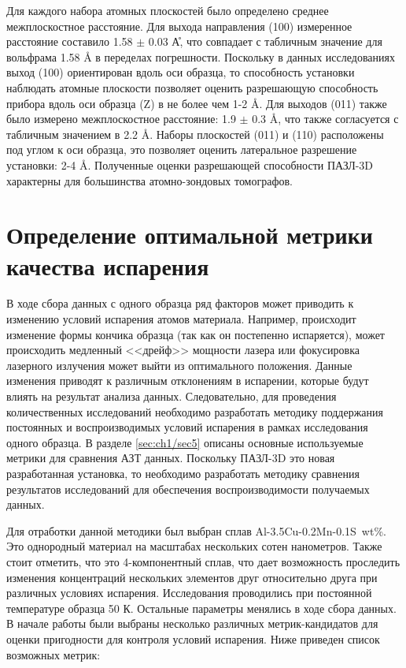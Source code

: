 Для каждого набора атомных плоскостей было определено среднее межплоскостное расстояние. Для выхода направления (100) измеренное расстояние составило 1.58 $\pm$ 0.03 \r{А}, что совпадает с табличным значение для вольфрама 1.58 \r{A} в переделах погрешности. Поскольку в данных исследованиях выход (100) ориентирован вдоль оси образца, то способность установки наблюдать атомные плоскости позволяет оценить разрешающую способность прибора вдоль оси образца (Z) в не более чем 1-2 \r{A}. Для выходов (011) также было измерено межплоскостное расстояние: 1.9 $\pm$ 0.3 \r{A}, что также согласуется с табличным значением в 2.2 \r{A}. Наборы плоскостей (011) и (110) расположены под углом к оси образца, это позволяет оценить латеральное разрешение установки: 2-4 \r{A}. Полученные оценки разрешающей способности ПАЗЛ-3D  характерны для большинства атомно-зондовых томографов. 

\FloatBarrier

\section{Определение оптимальной метрики качества испарения}\label{sec:ch3/sect3}

В ходе сбора данных с одного образца ряд факторов может приводить к изменению условий испарения атомов материала. Например, происходит изменение формы кончика образца (так как он постепенно испаряется), может происходить медленный <<дрейф>>  мощности лазера или фокусировка лазерного излучения может выйти из оптимального положения. Данные изменения приводят к различным отклонениям в испарении, которые будут влиять на результат анализа данных. Следовательно, для проведения количественных исследований необходимо разработать методику поддержания постоянных и воспроизводимых условий испарения в рамках исследования одного образца. В разделе \cref{sec:ch1/sec5} описаны основные используемые метрики для сравнения АЗТ данных. Поскольку ПАЗЛ-3D это новая разработанная установка, то необходимо разработать методику сравнения результатов исследований для обеспечения воспроизводимости получаемых данных.

Для отработки данной методики был выбран сплав Al-3.5Cu-0.2Mn-0.1S~wt\%. Это однородный материал на масштабах нескольких сотен нанометров. Также стоит отметить, что это 4-компонентный сплав, что дает возможность проследить изменения концентраций нескольких элементов друг относительно друга при различных условиях испарения. Исследования проводились при постоянной температуре образца 50 К. Остальные параметры менялись в ходе сбора данных. В начале работы были выбраны несколько различных метрик-кандидатов для оценки пригодности для контроля условий испарения. Ниже приведен список возможных метрик:

